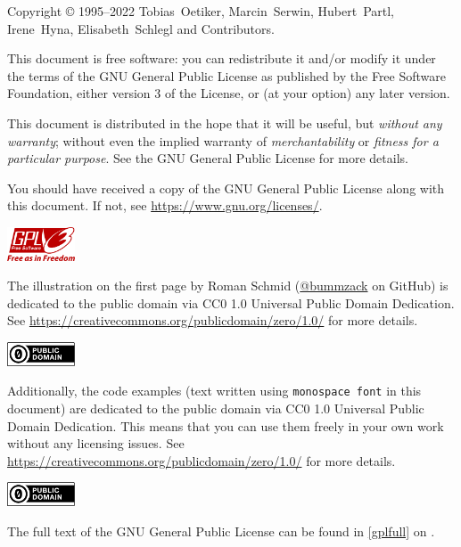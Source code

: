 \begin{small}
  \noindent Copyright \copyright{} 1995--2022 Tobias~Oetiker, Marcin~Serwin,
  Hubert~Partl, Irene~Hyna, Elisabeth~Schlegl and Contributors.

  This document is free software: you can redistribute it and/or modify it under
  the terms of the GNU General Public License as published by the Free Software
  Foundation, either version 3 of the License, or (at your option) any later
  version.

  This document is distributed in the hope that it will be useful, but
  \emph{without any warranty}; without even the implied warranty of
  \emph{merchantability} or \emph{fitness for a particular purpose}.  See
  the GNU General Public License for more details.

  You should have received a copy of the GNU General Public License along with
  this document.  If not, see \url{https://www.gnu.org/licenses/}.
  \vspace{-5pt}
  \begin{flushright}
    \href{https://www.gnu.org/licenses/gpl-3.0.html}{%
      \includegraphics[width=2cm]{images/gpl3.pdf}}\hspace*{10pt}
  \end{flushright}

  \bigskip\noindent The illustration on the first page by Roman Schmid
  (\href{https://github.com/bummzack}{@bummzack} on GitHub) is dedicated to the
  public domain via CC0 1.0 Universal Public Domain Dedication. See
  \url{https://creativecommons.org/publicdomain/zero/1.0/} for more details.
  \vspace{-15pt}
  \begin{flushright}
    \href{https://creativecommons.org/publicdomain/zero/1.0/}{%
      \includegraphics[width=2cm]{images/cc-zero.pdf}}\hspace*{10pt}
  \end{flushright}

  \bigskip\noindent
  Additionally, the code examples (text written using \texttt{monospace font}
  in this document) are dedicated to the public domain via CC0 1.0 Universal
  Public Domain Dedication. This means that you can use them freely in your own
  work without any licensing issues. See
  \url{https://creativecommons.org/publicdomain/zero/1.0/} for more details.
  \vspace{-15pt}
  \begin{flushright}
    \href{https://creativecommons.org/publicdomain/zero/1.0/}{%
      \includegraphics[width=2cm]{images/cc-zero.pdf}}\hspace*{10pt}
  \end{flushright}

  \noindent The full text of the GNU General Public License can be found in
  \autoref{gplfull} on .
\end{small}
\cleardoublepage
